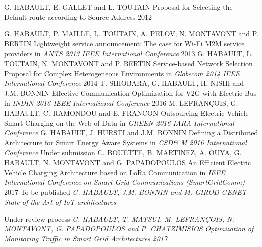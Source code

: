 \documentclass[11pt, a4paper]{awesome-cv}
\begin{document}


\begin{cvhonors}
  \cvpublication
  	{}
    {G. HABAULT, E. GALLET and L. TOUTAIN}
    {Proposal for Selecting the Default-route according to Source Address}
    {}
    {2012}
\end{cvhonors}

\begin{cvhonors}
  \cvpublication
  	{}
    {G. HABAULT, P. MAILLE, L. TOUTAIN, A. PELOV, N. MONTAVONT and P. BERTIN}
    {Lightweight service announcement: The
case for Wi-Fi M2M service providers}
    {in \textit{ANTS 2013 IEEE International Conference}}
    {2013}
  \cvpublication
  	{}
    {G. HABAULT, L. TOUTAIN, N. MONTAVONT and P. BERTIN}
    {Service-based Network Selection Proposal for Complex
Heterogeneous Environments}
    {in \textit{Globecom 2014 IEEE International Conference}}
    {2014}
  \cvpublication
  	{}
    {T. SHIOBARA, G. HABAULT, H. NISHI and J.M. BONNIN}
    {Effective Communication Optimization for V2G with Electric Bus}
    {in \textit{INDIN 2016 IEEE International Conference}}
    {2016}
  \cvpublication
  	{}
    {M. LEFRANÇOIS, G. HABAULT, C. RAMONDOU and E. FRANCON}
    {Outsourcing Electric Vehicle Smart Charging on the Web of
Data}
    {in \textit{GREEN 2016 IARA International Conference}}
    {}     
  \cvpublication
  	{}
    {G. HABAULT, J. HURSTI and J.M. BONNIN}
    {Defining a Distributed Architecture for Smart Energy Aware Systems}
    {in \textit{CSD\& M
2016 International Conference}}
    {}
  \cvpublication
  	{Under submission}
    {C. BOUETTE, B. MARTINEZ, A. OUYA, G. HABAULT, N. MONTAVONT and G. PAPADOPOULOS}
    {An Efficient Electric Vehicle Charging Architecture based on LoRa Communication}
    {in \textit{IEEE International Conference on Smart Grid Communications (SmartGridComm)}}
    {2017}
  \cvpublication
  	{To be published}
    {\textit{G. HABAULT, J.M. BONNIN and M. GIROD-GENET}}
    {\textit{State-of-the-Art of IoT architectures}}
    {}
    {}
\end{cvhonors}
    
\begin{cvhonors}
  \cvpublication
  	{Under review process}
    {\textit{G. HABAULT, T. MATSUI, M. LEFRANÇOIS, N. MONTAVONT, G. PAPADOPOULOS and P. CHATZIMISIOS}}
    {\textit{Optimization of Monitoring Traffic in Smart Grid Architectures}}
    {}
    {\textit{2017}}   
\end{cvhonors}
\end{document}
